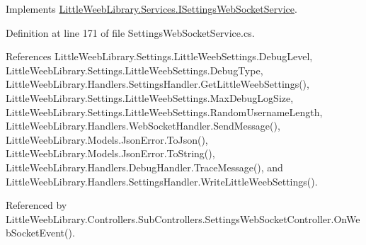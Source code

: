 Implements \mbox{\hyperlink{interface_little_weeb_library_1_1_services_1_1_i_settings_web_socket_service_a30b412115be9b4480ab1d195674b1c49}{Little\+Weeb\+Library.\+Services.\+I\+Settings\+Web\+Socket\+Service}}.



Definition at line 171 of file Settings\+Web\+Socket\+Service.\+cs.



References Little\+Weeb\+Library.\+Settings.\+Little\+Weeb\+Settings.\+Debug\+Level, Little\+Weeb\+Library.\+Settings.\+Little\+Weeb\+Settings.\+Debug\+Type, Little\+Weeb\+Library.\+Handlers.\+Settings\+Handler.\+Get\+Little\+Weeb\+Settings(), Little\+Weeb\+Library.\+Settings.\+Little\+Weeb\+Settings.\+Max\+Debug\+Log\+Size, Little\+Weeb\+Library.\+Settings.\+Little\+Weeb\+Settings.\+Random\+Username\+Length, Little\+Weeb\+Library.\+Handlers.\+Web\+Socket\+Handler.\+Send\+Message(), Little\+Weeb\+Library.\+Models.\+Json\+Error.\+To\+Json(), Little\+Weeb\+Library.\+Models.\+Json\+Error.\+To\+String(), Little\+Weeb\+Library.\+Handlers.\+Debug\+Handler.\+Trace\+Message(), and Little\+Weeb\+Library.\+Handlers.\+Settings\+Handler.\+Write\+Little\+Weeb\+Settings().



Referenced by Little\+Weeb\+Library.\+Controllers.\+Sub\+Controllers.\+Settings\+Web\+Socket\+Controller.\+On\+Web\+Socket\+Event().


